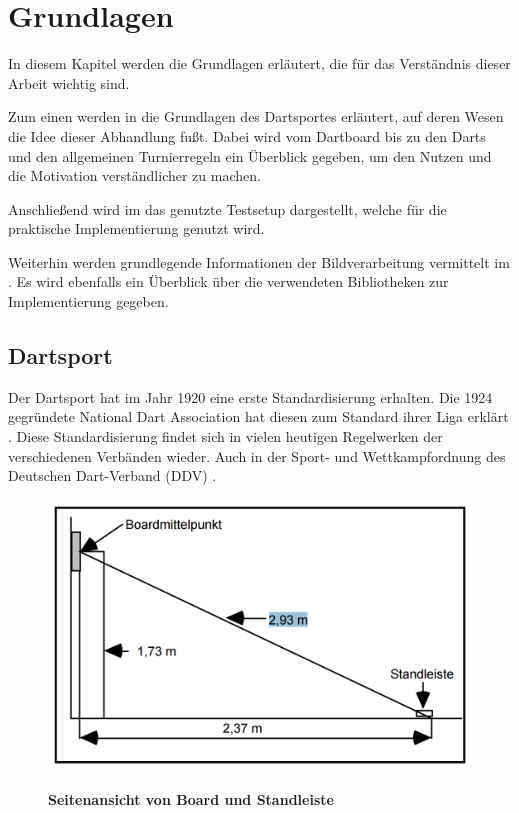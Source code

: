 
\chapter{Grundlagen}
\label{chap:fundamentals}
In diesem Kapitel werden die Grundlagen erläutert, die für das Verständnis dieser Arbeit wichtig sind. 

Zum einen werden in  die Grundlagen des Dartsportes erläutert, auf deren Wesen die Idee dieser Abhandlung fußt. Dabei wird vom Dartboard bis zu den Darts und den allgemeinen Turnierregeln ein Überblick gegeben, um den Nutzen und die Motivation verständlicher zu machen.

Anschließend wird im  das genutzte Testsetup dargestellt, welche für die praktische Implementierung genutzt wird.

Weiterhin werden grundlegende Informationen der Bildverarbeitung vermittelt im . Es wird ebenfalls ein Überblick über die verwendeten Bibliotheken zur Implementierung gegeben.
\section{Dartsport}
\label{sec:darts}
Der Dartsport hat im Jahr 1920 eine erste Standardisierung erhalten. Die 1924 gegründete National Dart Association hat diesen zum Standard ihrer Liga erklärt \autocite[Chapter 1]{guide2013}. Diese Standardisierung findet sich in vielen heutigen Regelwerken der verschiedenen Verbänden wieder. Auch in der Sport- und Wettkampfordnung des Deutschen
Dart-Verband (DDV) \autocite{DartsRegel2016}.

\begin{figure}
\includegraphics[width=\textwidth]{media/Dartsfield}\\
\caption{\textbf{Seitenansicht von Board und Standleiste 
\cite[8]{DartsRegel2016}}
}
\label{Fig:darts}
\end{figure}

